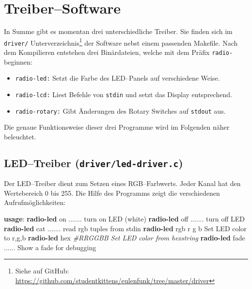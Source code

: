 \documentclass[11pt,ngerman,toc=listof,index=totoc]{scrreprt}
\newenvironment{Shaded}{}{}
\newcommand{\KeywordTok}[1]{\textcolor[rgb]{0.00,0.44,0.13}{\textbf{{#1}}}}
\newcommand{\CommentTok}[1]{\textcolor[rgb]{0.38,0.63,0.69}{\textit{{#1}}}}
\newcommand{\NormalTok}[1]{{#1}}
\providecommand{\tightlist}{%
  \setlength{\itemsep}{0pt}\setlength{\parskip}{0pt}}
\begin{document}
\section{Treiber--Software}\label{treibersoftware}

In Summe gibt es momentan drei unterschiedliche Treiber. Sie finden sich
im \texttt{driver/} Unterverzeichnis\footnote{Siehe auf GitHub:
  \url{https://github.com/studentkittens/eulenfunk/tree/master/driver}}
der Software nebst einem passenden Makefile. Nach dem Kompilieren
entstehen drei Binärdateien, welche mit dem Präfix \texttt{radio-}
beginnen:

\begin{itemize}
\tightlist
\item
  \texttt{radio-led:} Setzt die Farbe des LED--Panels auf verschiedene
  Weise.
\item
  \texttt{radio-lcd:} Liest Befehle von \texttt{stdin} und setzt das
  Display entsprechend.
\item
  \texttt{radio-rotary:} Gibt Änderungen des Rotary Switches auf
  \texttt{stdout} aus.
\end{itemize}

Die genaue Funktionsweise dieser drei Programme wird im Folgenden näher
beleuchtet.

\subsection{\texorpdfstring{LED--Treiber
(\texttt{driver/led-driver.c})}{LED--Treiber (driver/led-driver.c)}}\label{ledtreiber-driverled-driver.c}

Der LED--Treiber dient zum Setzen eines RGB--Farbwerts. Jeder Kanal hat
den Wertebereich 0 bis 255. Die Hilfe des Programms zeigt die
verschiedenen Aufrufmöglichkeiten:

\begin{Shaded}
\begin{Highlighting}[]
\KeywordTok{usage}\NormalTok{:}
  \KeywordTok{radio-led} \NormalTok{on  ....... turn on LED (white)}
  \KeywordTok{radio-led} \NormalTok{off ....... turn off LED}
  \KeywordTok{radio-led} \NormalTok{cat ....... read rgb tuples from stdin}
  \KeywordTok{radio-led} \NormalTok{rgb  r g b  Set LED color to r,g,b}
  \KeywordTok{radio-led} \NormalTok{hex }\CommentTok{#RRGGBB Set LED color from hexstring}
  \KeywordTok{radio-led} \NormalTok{fade ...... Show a fade for debugging}
\end{Highlighting}
\end{Shaded}
\end{document}
